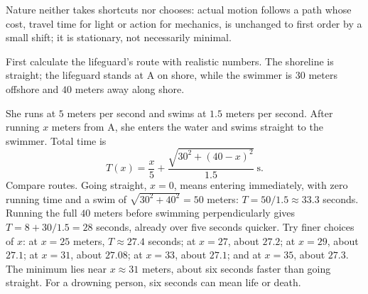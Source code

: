 
\begin{oneline}
Nature neither takes shortcuts nor chooses: actual motion follows a path whose cost, travel time for light or action for mechanics, is unchanged to first order by a small shift; it is stationary, not necessarily minimal.
\end{oneline}


\begin{mainline}
First calculate the lifeguard's route with realistic numbers. The shoreline is straight; the lifeguard stands at A on shore, while the swimmer is \(30\) meters offshore and \(40\) meters away along shore.

\begin{center}
\end{center}

She runs at \(5\) meters per second and swims at \(1.5\) meters per second. After running \(x\) meters from A, she enters the water and swims straight to the swimmer. Total time is
\[
  T(x)=\frac{x}{5}+\frac{\sqrt{30^2+(40-x)^2}}{1.5}\ \text{s}.
\]
Compare routes. Going straight, \(x=0\), means entering immediately, with zero running time and a swim of \(\sqrt{30^2+40^2}=50\) meters: \(T=50/1.5\approx 33.3\) seconds. Running the full \(40\) meters before swimming perpendicularly gives \(T=8+30/1.5=28\) seconds, already over five seconds quicker. Try finer choices of \(x\): at \(x=25\) meters, \(T\approx27.4\) seconds; at \(x=27\), about \(27.2\); at \(x=29\), about \(27.1\); at \(x=31\), about \(27.08\); at \(x=33\), about \(27.1\); and at \(x=35\), about \(27.3\). The minimum lies near \(x\approx31\) meters, about six seconds faster than going straight. For a drowning person, six seconds can mean life or death.


\end{mainline}
